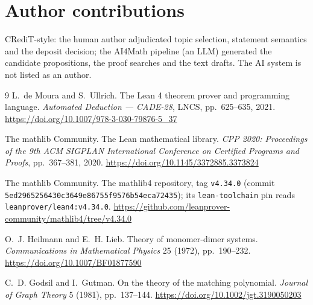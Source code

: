 \documentclass[11pt]{article}
\theoremstyle{definition}
\begin{document}
\section*{Author contributions}

CRediT-style: the human author adjudicated topic selection, statement semantics
and the deposit decision; the AI4Math pipeline (an LLM) generated the candidate
propositions, the proof searches and the text drafts. The AI system is not
listed as an author.

\begin{thebibliography}{9}
L.~de Moura and S.~Ullrich.
\newblock The Lean 4 theorem prover and programming language.
\newblock \emph{Automated Deduction --- CADE-28}, LNCS, pp.~625--635, 2021.
\url{https://doi.org/10.1007/978-3-030-79876-5_37}

The mathlib Community.
\newblock The Lean mathematical library.
\newblock \emph{CPP 2020: Proceedings of the 9th ACM SIGPLAN International
Conference on Certified Programs and Proofs}, pp.~367--381, 2020.
\url{https://doi.org/10.1145/3372885.3373824}

The mathlib Community.
\newblock The mathlib4 repository, tag \texttt{v4.34.0} (commit
\texttt{5ed2965256430c3649e86755f9576b54eca72435}); its \texttt{lean-toolchain}
pin reads \texttt{leanprover/lean4:v4.34.0}.
\newblock \url{https://github.com/leanprover-community/mathlib4/tree/v4.34.0}

O.~J. Heilmann and E.~H. Lieb.
\newblock Theory of monomer-dimer systems.
\newblock \emph{Communications in Mathematical Physics} 25 (1972),
pp.~190--232.
\url{https://doi.org/10.1007/BF01877590}

C.~D. Godsil and I.~Gutman.
\newblock On the theory of the matching polynomial.
\newblock \emph{Journal of Graph Theory} 5 (1981), pp.~137--144.
\url{https://doi.org/10.1002/jgt.3190050203}


\end{thebibliography}
\end{document}

